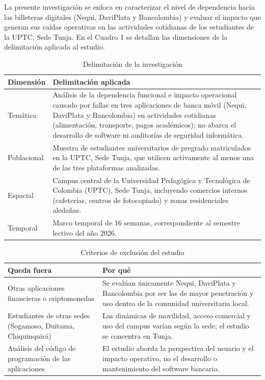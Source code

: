La presente investigación se enfoca en caracterizar el nivel de dependencia hacia las billeteras digitales (Nequi, DaviPlata y Bancolombia) y evaluar el impacto que generan sus caídas operativas en las actividades cotidianas de los estudiantes de la UPTC, Sede Tunja. En el Cuadro 1 se detallan las dimensiones de la delimitación aplicada al estudio.

\begin{table}[htbp]
\centering
\begin{tabular}{|p{3cm}|p{12cm}|}
\hline
\textbf{Dimensión} & \textbf{Delimitación aplicada} \\ \hline
Temática & Análisis de la dependencia funcional e impacto operacional causado por fallas en tres aplicaciones de banca móvil (Nequi, DaviPlata y Bancolombia) en actividades cotidianas (alimentación, transporte, pagos académicos); no abarca el desarrollo de software ni auditorías de seguridad informática. \\ \hline
Poblacional & Muestra de estudiantes universitarios de pregrado matriculados en la UPTC, Sede Tunja, que utilicen activamente al menos una de las tres plataformas analizadas. \\ \hline
Espacial & Campus central de la Universidad Pedagógica y Tecnológica de Colombia (UPTC), Sede Tunja, incluyendo comercios internos (cafeterías, centros de fotocopiado) y zonas residenciales aledañas. \\ \hline
Temporal & Marco temporal de 16 semanas, correspondiente al semestre lectivo del año 2026. \\ \hline
\end{tabular}
\caption{Delimitación de la investigación}
\label{tab:delimitacion}
\end{table}

\begin{table}[htbp]
\centering
\begin{tabular}{|p{4.5cm}|p{10.5cm}|}
\hline
\textbf{Queda fuera} & \textbf{Por qué} \\ \hline
Otras aplicaciones financieras o criptomonedas & Se evalúan únicamente Nequi, DaviPlata y Bancolombia por ser las de mayor penetración y uso dentro de la comunidad universitaria local. \\ \hline
Estudiantes de otras sedes (Sogamoso, Duitama, Chiquinquirá) & Las dinámicas de movilidad, acceso comercial y uso del campus varían según la sede; el estudio se concentra en Tunja. \\ \hline
Análisis del código de programación de las aplicaciones & El estudio aborda la perspectiva del usuario y el impacto operativo, no el desarrollo o mantenimiento del software bancario. \\ \hline
\end{tabular}
\caption{Criterios de exclusión del estudio}
\label{tab:exclusion}
\end{table}
